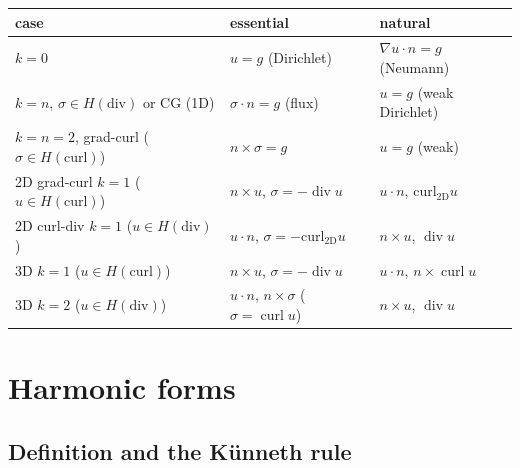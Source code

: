 \documentclass[11pt]{article}
\newcommand{\curltwo}{\operatorname{curl_{2D}}}
\newcommand{\curl}{\operatorname{curl}}
\renewcommand{\div}{\operatorname{div}}
\theoremstyle{remark}
\begin{document}
\begin{center}
\renewcommand{\arraystretch}{1.2}
\begin{tabular}{@{}lll@{}}
\toprule
case & essential & natural\\
\midrule
$k=0$ & $u=g$ (Dirichlet) & $\nabla u\cdot n = g$ (Neumann)\\
$k=n$, $\sigma\in H(\mathrm{div})$ or CG (1D) & $\sigma\cdot n=g$ (flux) & $u=g$ (weak Dirichlet)\\
$k=n=2$, grad-curl ($\sigma\in H(\mathrm{curl})$) & $n\times\sigma=g$ & $u=g$ (weak)\\
2D grad-curl $k=1$ ($u\in H(\mathrm{curl})$) & $n\times u$, $\sigma=-\div u$ & $u\cdot n$, $\curltwo u$\\
2D curl-div $k=1$ ($u\in H(\mathrm{div})$) & $u\cdot n$, $\sigma=-\curltwo u$ & $n\times u$, $\div u$\\
3D $k=1$ ($u\in H(\mathrm{curl})$) & $n\times u$, $\sigma=-\div u$ & $u\cdot n$, $n\times\curl u$\\
3D $k=2$ ($u\in H(\mathrm{div})$) & $u\cdot n$, $n\times\sigma$ ($\sigma=\curl u$) & $n\times u$, $\div u$\\
\bottomrule
\end{tabular}
\end{center}

\section{Harmonic forms}\label{sec:harmonic}

\subsection{Definition and the K\"unneth rule}
\end{document}
